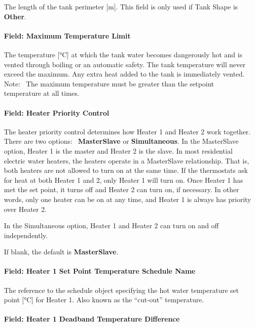 The length of the tank perimeter {[}m{]}. This field is only used if Tank Shape is \textbf{Other}.

\paragraph{Field: Maximum Temperature Limit}\label{field-maximum-temperature-limit-1}

The temperature {[}°C{]} at which the tank water becomes dangerously hot and is vented through boiling or an automatic safety. The tank temperature will never exceed the maximum. Any extra heat added to the tank is immediately vented. Note:~ The maximum temperature must be greater than the setpoint temperature at all times.

\paragraph{Field: Heater Priority Control}\label{field-heater-priority-control}

The heater priority control determines how Heater 1 and Heater 2 work together. There are two options:~ \textbf{MasterSlave} or \textbf{Simultaneous}. In the MasterSlave option, Heater 1 is the master and Heater 2 is the slave. In most residential electric water heaters, the heaters operate in a MasterSlave relationship. That is, both heaters are not allowed to turn on at the same time. If the thermostats ask for heat at both Heater 1 and 2, only Heater 1 will turn on. Once Heater 1 has met the set point, it turns off and Heater 2 can turn on, if necessary. In other words, only one heater can be on at any time, and Heater 1 is always has priority over Heater 2.

In the Simultaneous option, Heater 1 and Heater 2 can turn on and off independently.

If blank, the default is \textbf{MasterSlave}.

\paragraph{Field: Heater 1 Set Point Temperature Schedule Name}\label{field-heater-1-set-point-temperature-schedule-name}

The reference to the schedule object specifying the hot water temperature set point {[}°C{]} for Heater 1. Also known as the ``cut-out'' temperature.

\paragraph{Field: Heater 1 Deadband Temperature Difference}\label{field-heater-1-deadband-temperature-difference}

